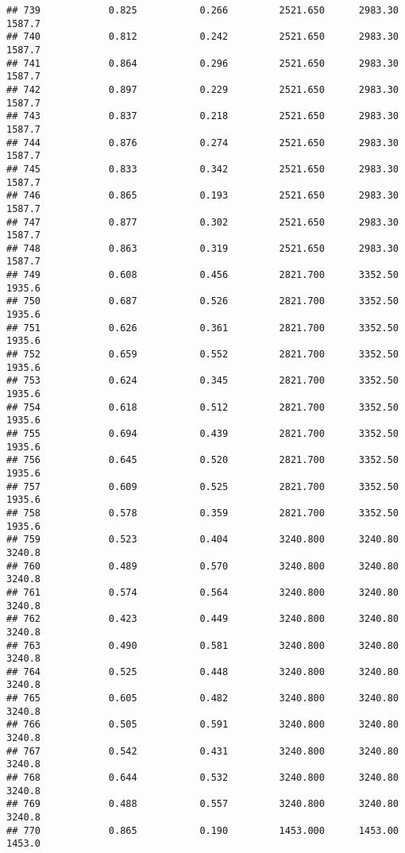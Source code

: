 \documentclass[
]{article}
\begin{document}
\begin{verbatim}
## 739            0.825           0.266         2521.650      2983.30       1587.7
## 740            0.812           0.242         2521.650      2983.30       1587.7
## 741            0.864           0.296         2521.650      2983.30       1587.7
## 742            0.897           0.229         2521.650      2983.30       1587.7
## 743            0.837           0.218         2521.650      2983.30       1587.7
## 744            0.876           0.274         2521.650      2983.30       1587.7
## 745            0.833           0.342         2521.650      2983.30       1587.7
## 746            0.865           0.193         2521.650      2983.30       1587.7
## 747            0.877           0.302         2521.650      2983.30       1587.7
## 748            0.863           0.319         2521.650      2983.30       1587.7
## 749            0.608           0.456         2821.700      3352.50       1935.6
## 750            0.687           0.526         2821.700      3352.50       1935.6
## 751            0.626           0.361         2821.700      3352.50       1935.6
## 752            0.659           0.552         2821.700      3352.50       1935.6
## 753            0.624           0.345         2821.700      3352.50       1935.6
## 754            0.618           0.512         2821.700      3352.50       1935.6
## 755            0.694           0.439         2821.700      3352.50       1935.6
## 756            0.645           0.520         2821.700      3352.50       1935.6
## 757            0.609           0.525         2821.700      3352.50       1935.6
## 758            0.578           0.359         2821.700      3352.50       1935.6
## 759            0.523           0.404         3240.800      3240.80       3240.8
## 760            0.489           0.570         3240.800      3240.80       3240.8
## 761            0.574           0.564         3240.800      3240.80       3240.8
## 762            0.423           0.449         3240.800      3240.80       3240.8
## 763            0.490           0.581         3240.800      3240.80       3240.8
## 764            0.525           0.448         3240.800      3240.80       3240.8
## 765            0.605           0.482         3240.800      3240.80       3240.8
## 766            0.505           0.591         3240.800      3240.80       3240.8
## 767            0.542           0.431         3240.800      3240.80       3240.8
## 768            0.644           0.532         3240.800      3240.80       3240.8
## 769            0.488           0.557         3240.800      3240.80       3240.8
## 770            0.865           0.190         1453.000      1453.00       1453.0

\end{verbatim}
\end{document}

